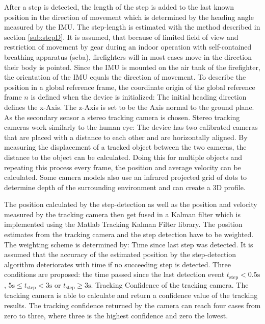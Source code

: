 \documentclass[engproc,conferenceproceedings,submit,pdftex,moreauthors]{Definitions/mdpi}
\begin{document}
%	

After a step is detected, the length of the step is added to the last known position in the direction of movement which is determined by the heading angle measured by the IMU. The step-length is estimated with the method described in section \ref{sub:stepD}. It is assumed, that because of limited field of view and restriction of movement by gear during an indoor operation with self-contained breathing apparatus (scba), firefighters will in most cases move in the direction their body is pointed. Since the IMU is mounted on the air tank of the firefighter, the orientation of the IMU equals the direction of movement. To describe the position in a global reference frame, the coordinate origin of the global reference frame $n$ is defined when the device is initialized: The initial heading direction defines the x-Axis. The z-Axis is set to be the Axis normal to the ground plane. As the secondary sensor a stereo tracking camera is chosen. Stereo tracking cameras work similarly to the human eye: The device has two calibrated cameras that are placed with a distance to each other and are horizontally aligned. By measuring the displacement of a tracked object between the two cameras, the distance to the object can be calculated. 
Doing this for multiple objects and repeating this process every frame, the position and average velocity can be calculated. 
Some camera models also use an infrared projected grid of dots to determine depth of the surrounding environment and can create a 3D profile.


The position calculated by the step-detection as well as the position and velocity measured by the tracking camera then get fused in a Kalman filter which is implemented using the Matlab Tracking Kalman Filter library.
The position estimates from the tracking camera and the step detection have to be weighted. The weighting scheme is determined by: Time since last step was detected. It is assumed that the accuracy of the estimated position by the step-detection algorithm deteriorates with time if no succeeding step is detected. Three conditions are proposed: the time passed since the last detection event $t_{\text{step}} < 0.5\mathrm{s}$, $5\mathrm{s} \leq t_{\text{step}} < 3\mathrm{s}$ or $t_{\text{step}} \geq 3\mathrm{s}$. Tracking Confidence of the tracking camera. The tracking camera is able to calculate and return a confidence value of the tracking results. The tracking confidence returned by the camera can reach four cases from zero to three, where three is the highest confidence and zero the lowest.
\end{document}
